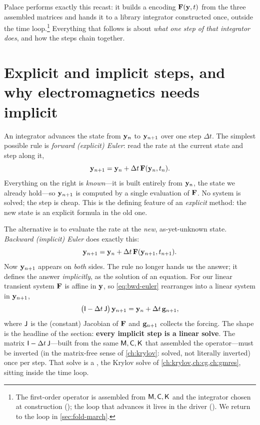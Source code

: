 Palace performs exactly this recast: it builds a
 encoding $\mathbf{F}(\mathbf{y}, t)$ from the three
assembled matrices and hands it to a library integrator constructed once, outside
the time loop.\footnote{The first-order operator is assembled from $\mathsf{M},\mathsf{C},\mathsf{K}$
and the integrator chosen at construction
(); the loop that advances it lives in
the driver (). We return to the loop in
\cref{sec:fold-march}.} Everything that follows is about \emph{what one step of
that integrator does}, and how the steps chain together.

\section{Explicit and implicit steps, and why electromagnetics needs implicit}
\label{sec:explicit-implicit}

An integrator advances the state from $\mathbf{y}_n$ to $\mathbf{y}_{n+1}$ over one step
$\Delta t$. The simplest possible rule is \emph{forward (explicit) Euler}: read the
rate at the current state and step along it,
\begin{equation}
  \mathbf{y}_{n+1} = \mathbf{y}_n + \Delta t\,\mathbf{F}(\mathbf{y}_n, t_n).
  \label{eq:fwd-euler}
\end{equation}
Everything on the right is \emph{known}---it is built entirely from $\mathbf{y}_n$, the
state we already hold---so $\mathbf{y}_{n+1}$ is computed by a single evaluation of
$\mathbf{F}$. No system is solved; the step is cheap. This is the defining feature of an
\emph{explicit} method: the new state is an explicit formula in the old one.

The alternative is to evaluate the rate at the \emph{new}, as-yet-unknown state.
\emph{Backward (implicit) Euler} does exactly this:
\begin{equation}
  \mathbf{y}_{n+1} = \mathbf{y}_n + \Delta t\,\mathbf{F}(\mathbf{y}_{n+1}, t_{n+1}).
  \label{eq:bwd-euler}
\end{equation}
Now $\mathbf{y}_{n+1}$ appears on \emph{both} sides. The rule no longer hands us the
answer; it defines the answer \emph{implicitly}, as the solution of an equation.
For our linear transient system $\mathbf{F}$ is affine in $\mathbf{y}$, so
\cref{eq:bwd-euler} rearranges into a linear system in $\mathbf{y}_{n+1}$,
\begin{equation}
  \bigl(\mathsf{I} - \Delta t\,\mathsf{J}\bigr)\,\mathbf{y}_{n+1} = \mathbf{y}_n + \Delta t\,\mathbf{g}_{n+1},
  \label{eq:implicit-solve}
\end{equation}
where $\mathsf{J}$ is the (constant) Jacobian of $\mathbf{F}$ and $\mathbf{g}_{n+1}$ collects the
forcing. The shape is the headline of the section: \textbf{every implicit step is a
linear solve}. The matrix $\mathsf{I} - \Delta t\,\mathsf{J}$---built from the same
$\mathsf{M}, \mathsf{C}, \mathsf{K}$ that assembled the operator---must be inverted (in the
matrix-free sense of \cref{ch:krylov}: solved, not literally inverted) once per
step. That solve is a , the Krylov solve of
\cref{ch:krylov,ch:cg,ch:gmres}, sitting inside the time loop.

